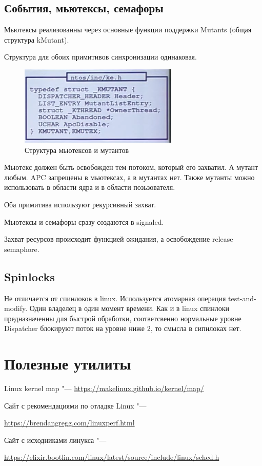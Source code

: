 \documentclass[bachelor, och, book]{SCWorks}
\theoremstyle{remark}
\begin{document}
    \subsection{События, мьютексы, семафоры}

    Мьютексы реализованны через основные функции поддержки Mutants (общая структура kMutant).

    Структура для обоих примитивов синхронизации одинаковая.

    \begin{figure}[H]
        \begin{center}
            \includegraphics[scale=0.7]{res/Kmutant.png}
            \caption{Структура мьютексов и мутантов}
        \end{center}
    \end{figure}

    Мьютекс должен быть освобожден тем потоком, который его захватил. А мутант любым.
    APC запрещены в мьютексах, а в мутантах нет. Также мутанты можно использовать в области ядра и в области позьзователя. 

    Оба примитива используют рекурсивный захват.

    Мьютексы и семафоры сразу создаются в signaled.

    Захват ресурсов происходит функцией ожидания, а освобождение release semaphore.

    \subsection{Spinlocks}

    Не отличается от спинлоков в linux. Используется атомарная операция test-and-modify. Один владелец в один момент времени. Как и в linux спинлоки предназначенны для быстрой обработки, соответсвенно нормальные уровне Dispatcher блокируют поток на уровне ниже 2, то смысла в сипнлоках нет.

    \section{Полезные утилиты}

    Linux kernel map "--- \href{https://makelinux.github.io/kernel/map/}{https://makelinux.github.io/kernel/map/}

    Сайт с рекомендациями  по отладке Linux "--- 
    
    \href{https://brendangregg.com/linuxperf.html}{https://brendangregg.com/linuxperf.html}

    Сайт с исходниками линукса "--- 
    
    \href{https://elixir.bootlin.com/linux/latest/source/include/linux/sched.h}{https://elixir.bootlin.com/linux/latest/source/include/linux/sched.h}
\end{document}
